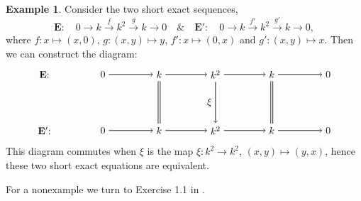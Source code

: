 \documentclass[11.5pt, twoside, a4paper, titlepage]{report}
\theoremstyle{definition}
\newtheorem{eg}[mydef]{Example}
\theoremstyle{plain}
\begin{document}
\begin{eg}
Consider the two short exact sequences, 
\begin{equation*}
\mathbf{E}: \quad 0\xrightarrow{}k\xrightarrow{f}k^2\xrightarrow{g}k\xrightarrow{}0  \quad \& \quad \mathbf{E'}: \quad 0\xrightarrow{}k\xrightarrow{f'}k^2\xrightarrow{g'}k\xrightarrow{}0 ,
\end{equation*}
where $f: x \mapsto (x, 0)$, $g: (x,y)\mapsto y$, $f':x \mapsto (0,x)$ and $g':(x,y)\mapsto x$. Then we can construct the diagram: 
\begin{equation*}
\begin{tikzpicture}[->,-latex, auto, main path/.style={->, semithick}, main node/.style={}]
\node	[main node]		(1) at (0,0)		{$\mathbf{E}$: \quad };
\node	[main node]		(2) at (2,0)		{$0$};
\node	[main node]		(3) at (4,0)		{$k$};
\node [main node]		(4) at (6,0)		{$k^2$};
\node [main node]		(5) at (8,0)		{$k$};
\node	[main node]		(11) at (10,0)	{$0$};

\node	[main node]		(6) at (0,-2)		{$\mathbf{E'}$: \quad};
\node	[main node]		(7) at (2,-2)		{$0$};
\node	[main node]		(8) at (4,-2)		{$k$};
\node [main node]		(9) at (6,-2)		{$k^2$};
\node [main node]		(10) at (8,-2)	{$k$};
\node [main node]		(13) at (10,-2)	{$0$};



\draw (2) edge [main path] node [auto] {$$} (3);
\draw (3) edge [main path] node [auto] {$$} (4);
\draw (4) edge [main path] node [auto] {$$} (5);
\draw (5) edge [main path] (11);


\draw (7) edge [main path] node [auto] {$$} (8);
\draw (8) edge [main path] node [auto] {$$} (9);
\draw (9) edge [main path] node [auto] {$$} (10);
\draw (10) edge [main path] (13);

\draw (3) edge [-, semithick, double, double distance=1.5pt] (8);
\draw (4) edge [main path] node [auto, swap] {$\xi$} (9);
\draw (5) edge [-, semithick, double, double distance=1.5pt](10);
\end{tikzpicture}
\end{equation*}
This diagram commutes when $\xi$ is the map $\xi: k^2 \to k^2$, $(x, y) \mapsto (y, x)$, hence these two short exact equations are equivalent.
\end{eg}

For a nonexample we turn to Exercise \uppercase\expandafter{} 1.1 in \cite{Stamm}.
\end{document}
